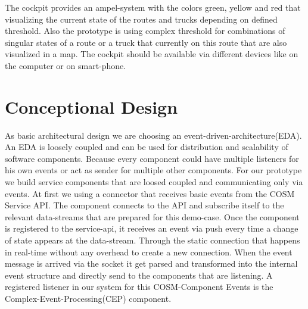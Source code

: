 \documentclass{acm_proc_article-sp}
\begin{document}
The cockpit provides an ampel-system with the colors green, yellow and red that visualizing the current state of the routes and trucks depending on defined threshold.
Also the prototype is using complex threshold for combinations of singular states of a route or a truck that currently on this route that are also visualized in a map.
The cockpit should be available via different devices like on the computer or on smart-phone.
\section{Conceptional Design}
\label{sec:Conceptional Design}

As basic architectural design we are choosing an event-driven-architecture(EDA).
An EDA is loosely coupled and can be used for distribution and scalability of software components. Because every component could have multiple listeners for his own events or act as sender for multiple other components.
For our prototype we build service components that are loosed coupled and communicating only via events.
At first we using a connector that receives basic events from the COSM Service API.
The component connects to the API and subscribe itself to the relevant data-streams that are prepared for this demo-case.
Once the component is registered to the service-api, it receives an event via push every time a change of state appears at the data-stream. Through the static connection that happens in real-time without any overhead to create a new connection.
When the event message is arrived via the socket it get parsed and transformed into the internal event structure and directly send to the components that are listening.
A registered listener in our system for this COSM-Component Events is the Complex-Event-Processing(CEP) component.
\end{document}
